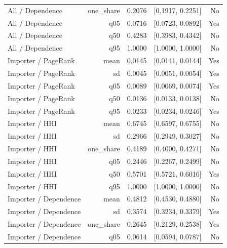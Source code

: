 \documentclass[pdftex,12pt,openright,a4paper,oneside]{book}
\begin{document}
\begin{longtable}{@{}p{}rrrr@{}}
All / Dependence & one\_share & 0.2076 & [0.1917, 0.2251] & No \\

All / Dependence & q05 & 0.0716 & [0.0723, 0.0892] & Yes \\

All / Dependence & q50 & 0.4283 & [0.3983, 0.4342] & No \\

All / Dependence & q95 & 1.0000 & [1.0000, 1.0000] & No \\

Importer / PageRank & mean & 0.0145 & [0.0141, 0.0144] & Yes \\

Importer / PageRank & sd & 0.0045 & [0.0051, 0.0054] & Yes \\

Importer / PageRank & q05 & 0.0089 & [0.0069, 0.0074] & Yes \\

Importer / PageRank & q50 & 0.0136 & [0.0133, 0.0138] & No \\

Importer / PageRank & q95 & 0.0233 & [0.0234, 0.0246] & Yes \\

Importer / HHI & mean & 0.6745 & [0.6597, 0.6755] & No \\

Importer / HHI & sd & 0.2966 & [0.2949, 0.3027] & No \\

Importer / HHI & one\_share & 0.4189 & [0.4000, 0.4271] & No \\

Importer / HHI & q05 & 0.2446 & [0.2267, 0.2499] & No \\

Importer / HHI & q50 & 0.5701 & [0.5721, 0.6016] & Yes \\

Importer / HHI & q95 & 1.0000 & [1.0000, 1.0000] & No \\

Importer / Dependence & mean & 0.4812 & [0.4530, 0.4880] & No \\

Importer / Dependence & sd & 0.3574 & [0.3234, 0.3379] & Yes \\

Importer / Dependence & one\_share & 0.2645 & [0.2129, 0.2538] & Yes \\

Importer / Dependence & q05 & 0.0614 & [0.0594, 0.0787] & No \\


\end{longtable}
\end{document}
